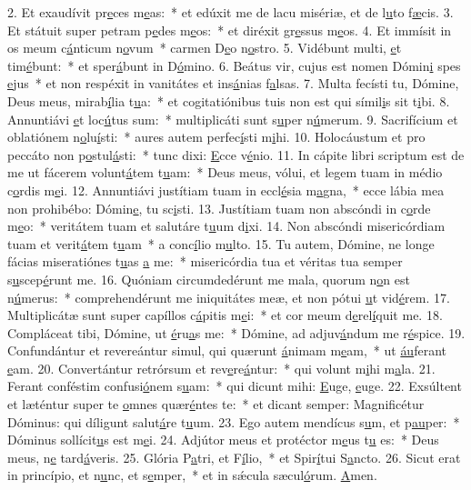 2. Et exaudívit pr\uline{e}ces m\uline{e}as:~* et edúxit me de lacu misériæ, et de l\uline{u}to f\uline{æ}cis.
3. Et státuit super petram p\uline{e}des m\uline{e}os:~* et diréxit gr\uline{e}ssus m\uline{e}os.
4. Et immísit in os meum c\uline{á}nticum n\uline{o}vum~* carmen D\uline{e}o n\uline{o}stro.
5. Vidébunt multi, \uline{e}t tim\uline{é}bunt:~* et sper\uline{á}bunt in D\uline{ó}mino.
6. Beátus vir, cujus est nomen Dómin\uline{i} spes \uline{e}jus~* et non respéxit in vanitátes et ins\uline{á}nias f\uline{a}lsas.
7. Multa fecísti tu, Dómine, Deus meus, mirab\uline{í}lia t\uline{u}a:~* et cogitatiónibus tuis non est qui símil\uline{i}s sit t\uline{i}bi.
8. Annuntiávi \uline{e}t loc\uline{ú}tus sum:~* multiplicáti sunt s\uline{u}per n\uline{ú}merum.
9. Sacrifícium et oblatiónem n\uline{o}lu\uline{í}sti:~* aures autem perfec\uline{í}sti m\uline{i}hi.
10. Holocáustum et pro peccáto non p\uline{o}stul\uline{á}sti:~* tunc dixi: \uline{E}cce v\uline{é}nio.
11. In cápite libri scriptum est de me ut fácerem volunt\uline{á}tem t\uline{u}am:~* Deus meus, vólui, et legem tuam in médio c\uline{o}rdis m\uline{e}i.
12. Annuntiávi justítiam tuam in eccl\uline{é}sia m\uline{a}gna,~* ecce lábia mea non prohibébo: Dómin\uline{e}, tu sc\uline{i}sti.
13. Justítiam tuam non abscóndi in c\uline{o}rde m\uline{e}o:~* veritátem tuam et salutáre t\uline{u}um d\uline{i}xi.
14. Non abscóndi misericórdiam tuam et verit\uline{á}tem t\uline{u}am~* a conc\uline{í}lio m\uline{u}lto.
15. Tu autem, Dómine, ne longe fácias miseratiónes t\uline{u}as \uline{a} me:~* misericórdia tua et véritas tua semper s\uline{u}scep\uline{é}runt me.
16. Quóniam circumdedérunt me mala, quorum n\uline{o}n est n\uline{ú}merus:~* comprehendérunt me iniquitátes meæ, et non pótui \uline{u}t vid\uline{é}rem.
17. Multiplicátæ sunt super capíllos c\uline{á}pitis m\uline{e}i:~* et cor meum d\uline{e}rel\uline{í}quit me.
18. Compláceat tibi, Dómine, ut \uline{é}ru\uline{a}s me:~* Dómine, ad adjuv\uline{á}ndum me r\uline{é}spice.
19. Confundántur et revereántur simul, qui quærunt \uline{á}nimam m\uline{e}am,~* ut \uline{áu}ferant \uline{e}am.
20. Convertántur retrórsum et rev\uline{e}re\uline{á}ntur:~* qui volunt m\uline{i}hi m\uline{a}la.
21. Ferant conféstim confusi\uline{ó}nem s\uline{u}am:~* qui dicunt mihi: \uline{E}uge, \uline{e}uge.
22. Exsúltent et læténtur super te \uline{o}mnes quær\uline{é}ntes te:~* et dicant semper: Magnificétur Dóminus: qui díligunt salut\uline{á}re t\uline{u}um.
23. Ego autem mendícus s\uline{u}m, et p\uline{au}per:~* Dóminus sollícit\uline{u}s est m\uline{e}i.
24. Adjútor meus et protéctor m\uline{e}us t\uline{u} es:~* Deus meus, n\uline{e} tard\uline{á}veris.
25. Glória P\uline{a}tri, et F\uline{í}lio,~* et Spir\uline{í}tui S\uline{a}ncto.
26. Sicut erat in princípio, et n\uline{u}nc, et s\uline{e}mper,~* et in sǽcula sæcul\uline{ó}rum. \uline{A}men.
